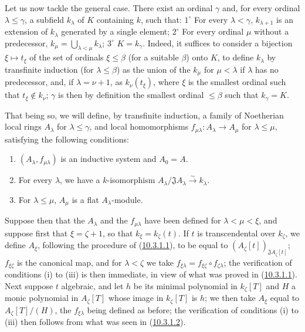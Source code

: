 \begin{env}[10.3.1.4]
\label{0.10.3.1.4}
Let us now tackle the general case. There exist an ordinal $\gamma$ and, for
every ordinal $\lambda\leq\gamma$, a subfield $k_\lambda$ of $K$ containing
$k$, such that: $1^\circ$ For every $\lambda<\gamma$, $k_{\lambda+1}$ is
an extension of $k_\lambda$ generated by a single element; $2^\circ$ For
every ordinal $\mu$ without a predecessor,
$k_\mu=\bigcup_{\lambda<\mu}k_\lambda$; $3^\circ$ $K=k_\gamma$. Indeed, it
suffices to consider a bijection $\xi\mapsto t_\xi$ of the set of
ordinals $\xi\leq\beta$ (for a suitable $\beta$) onto $K$, to define
$k_\lambda$ by transfinite induction (for $\lambda\leq\beta$) as the
union of the $k_\mu$ for $\mu<\lambda$ if $\lambda$ has no predecessor,
and, if $\lambda=\nu+1$, as $k_\nu(t_\xi)$, where $\xi$ is the smallest
ordinal such that $t_\xi\notin k_\nu$; $\gamma$ is then by definition the
smallest ordinal $\leq\beta$ such that $k_\gamma=K$.

That being so, we will define, by transfinite induction, a family
of Noetherian local rings $A_\lambda$ for $\lambda\leq\gamma$, and local
homomorphisms $f_{\mu\lambda}:A_\lambda\to A_\mu$ for
$\lambda\leq\mu$, satisfying the following conditions:
\begin{enumerate}
  \item[(i)] $(A_\lambda,f_{\mu\lambda})$ is an inductive system and $A_0=A$.
  \item[(ii)] For every $\lambda$, we have a $k$-isomorphism
    $A_\lambda/\mathfrak J A_\lambda\xrightarrow{\sim}k_\lambda$.
  \item[(iii)] For $\lambda\leq\mu$, $A_\mu$ is a flat $A_\lambda$-module.
\end{enumerate}

Suppose then that the $A_\lambda$ and the $f_{\mu\lambda}$ have been defined for
$\lambda<\mu<\xi$, and suppose first that $\xi=\zeta+1$, so
that $k_\xi=k_\zeta(t)$. If $t$ is transcendental over $k_\zeta$, we define
$A_\xi$, following the procedure of (\hyperref[0.10.3.1.1]{10.3.1.1}), to be
equal to $(A_\zeta[t])_{\mathfrak J A_\zeta[t]}$;
$f_{\xi\zeta}$ is the canonical map, and for $\lambda<\zeta$ we take
$f_{\xi\lambda}=f_{\xi\zeta}\circ f_{\zeta\lambda}$; the verification of
conditions (i) to (iii) is then immediate, in view of what was proved in
(\hyperref[0.10.3.1.1]{10.3.1.1}). Next suppose $t$ algebraic, and
let $h$ be its minimal polynomial in $k_\zeta[T]$ and $H$ a monic polynomial in
$A_\zeta[T]$ whose image in $k_\zeta[T]$ is $h$; we then take $A_\xi$
equal to $A_\zeta[T]/(H)$, the $f_{\xi\lambda}$ being defined as
before; the verification of conditions (i) to (iii) then follows from
what was seen in (\hyperref[0.10.3.1.2]{10.3.1.2}).


\end{env}
